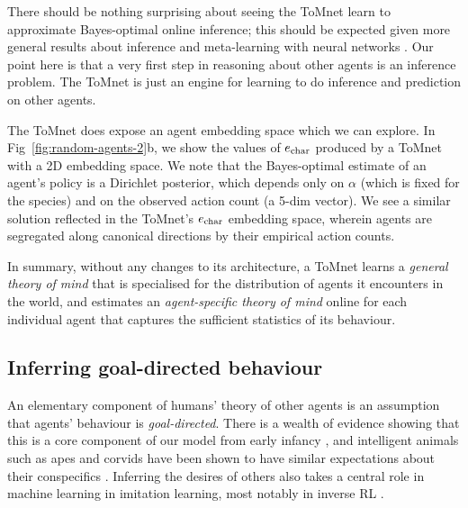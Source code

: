 \documentclass{article}
\begin{document}
There should be nothing surprising about seeing the ToMnet learn to approximate Bayes-optimal online inference; this should be expected given more general results about inference and meta-learning with neural networks \cite{mackay1995probable, finn2017meta}. Our point here is that a very first step in reasoning about other agents is an inference problem. The ToMnet is just an engine for learning to do inference and prediction on other agents.

The ToMnet does expose an agent embedding space which we can explore. In Fig~\ref{fig:random-agents-2}b, we show the values of $e_{\mathrm{char}}$ produced by a ToMnet with a 2D embedding space. We note that the Bayes-optimal estimate of an agent's policy is a Dirichlet posterior, which depends only on $\alpha$ (which is fixed for the species) and on the observed action count (a 5-dim vector). We see a similar solution reflected in the ToMnet's $e_{\mathrm{char}}$ embedding space, wherein agents are segregated along canonical directions by their empirical action counts.

In summary, without any changes to its architecture, a ToMnet learns a {\it general theory of mind} that is specialised for the distribution of agents it encounters in the world, and estimates an {\it agent-specific theory of mind} online for each individual agent that captures the sufficient statistics of its behaviour.



\subsection{Inferring goal-directed behaviour}
\label{section:inferring-goals}

An elementary component of humans' theory of other agents is an assumption that agents' behaviour is {\it goal-directed}. There is a wealth of evidence showing that this is a core component of our model from early infancy \cite{Gergely1995, Woodward1998, Woodward1999, Buresh2007}, and intelligent animals such as apes and corvids have been shown to have similar expectations about their conspecifics \cite{call2008does, ostojic2013evidence}. Inferring the desires of others also takes a central role in machine learning in imitation learning, most notably in inverse RL \cite{ng2000algorithms, abbeel2004apprenticeship}.
\end{document}
